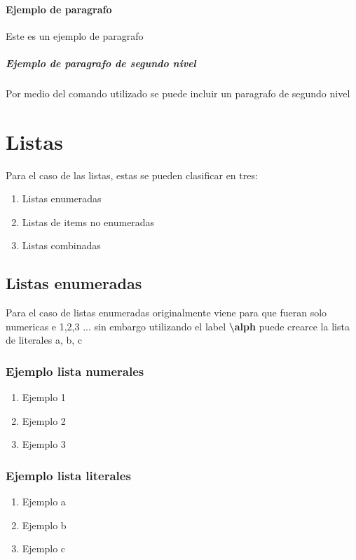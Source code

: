 \documentclass{article}
\begin{document}
\paragraph{Ejemplo de paragrafo} 
Este es un ejemplo de paragrafo

\subparagraph{Ejemplo de paragrafo de segundo nivel} 
Por medio del comando utilizado se puede incluir un paragrafo de segundo nivel

\section{Listas}
Para el caso de las listas, estas se pueden clasificar en tres:

\begin{enumerate}
	\item Listas enumeradas
	\item Listas de items no enumeradas
	\item Listas combinadas

\end{enumerate}

\subsection{Listas enumeradas}
Para el caso de listas enumeradas originalmente viene para que fueran solo numericas e 1,2,3 ...
sin embargo utilizando el label \textbf{\textbackslash alph} puede crearce la lista de literales a, b, c

\subsubsection{Ejemplo lista numerales}

\begin{enumerate}
	\item Ejemplo 1
	\item Ejemplo 2
	\item Ejemplo 3

\end{enumerate}

\subsubsection{Ejemplo lista literales}

\begin{enumerate}[label=\alph*)]
	\item Ejemplo a
	\item Ejemplo b
	\item Ejemplo c
\end{enumerate}
\end{document}
